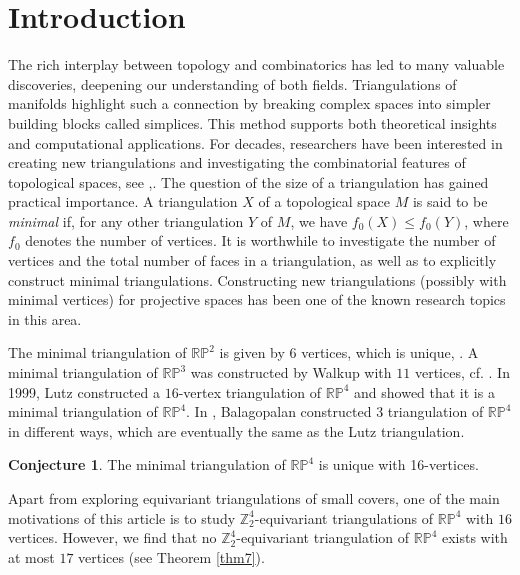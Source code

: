 \documentclass[11pt]{amsart}
\numberwithin{equation}{section}
\theoremstyle{definition}
\newtheorem{conj}[theorem]{Conjecture}
\newcommand{\RP}{\mathbb{RP}}
\begin{document}
\section{Introduction}

The rich interplay between topology and combinatorics has led to many valuable discoveries, deepening our understanding of both fields. Triangulations of manifolds highlight such a connection by breaking complex spaces into simpler building blocks called simplices. This method supports both theoretical insights and computational applications. For decades, researchers have been interested in creating new triangulations and investigating the combinatorial features of topological spaces, see \cite{bjorner2000simplicial},\cite{kuhnel1983unique}.  The question of the size of a triangulation has gained practical importance. A triangulation $X$ of a topological space $M$ is said to be {\em minimal} if, for any other triangulation $Y$ of $M$, we have $f_0(X) \leq f_0(Y)$, where $f_0$ denotes the number of vertices.
It is worthwhile to investigate the number of vertices and the total number of faces in a triangulation, as well as to explicitly construct minimal triangulations. Constructing new triangulations (possibly with minimal vertices) for projective spaces has been one of the known research topics in this area. 

The minimal triangulation of $\mathbb{RP}^2$ is given by $6$ vertices, which is unique, \cite{KB}. A minimal triangulation of $\mathbb{RP}^3$ was constructed by Walkup with $11$ vertices, cf. \cite{Walkup}. In 1999, Lutz \cite{Lutz16vertex} constructed a $16$-vertex triangulation of $\mathbb{RP}^4$ and showed that it is a minimal triangulation of $\mathbb{RP}^4$. In \cite{balagopalan}, Balagopalan constructed 3 triangulation of $\mathbb{RP}^4$ in different ways, which are eventually the same as the Lutz triangulation. 

\begin{conj}\cite{Lutz16vertex}\label{RP4conjecture}
   The minimal triangulation of $\RP^4$ is unique with 16-vertices.
\end{conj}

Apart from exploring equivariant triangulations of small covers, one of the main motivations of this article is to study $\mathbb{Z}_2^4$-equivariant triangulations of $\mathbb{RP}^4$ with $16$ vertices. However, we find that no $\mathbb{Z}_2^4$-equivariant triangulation of $\mathbb{RP}^4$ exists with at most $17$ vertices (see Theorem \ref{thm7}). 
\end{document}
